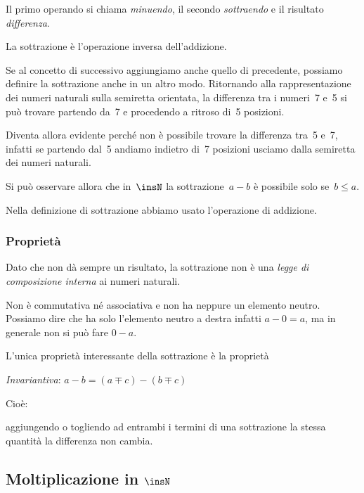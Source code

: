Il primo operando si chiama \emph{minuendo}, il secondo \emph{sottraendo} e 
il risultato \emph{differenza}.

La sottrazione è l'operazione inversa dell'addizione.

Se al concetto di successivo aggiungiamo anche quello di precedente, possiamo 
definire la sottrazione anche in un altro modo.
Ritornando alla rappresentazione dei numeri naturali sulla semiretta 
orientata, la differenza tra i numeri~7 e~5 si può trovare partendo da~7 e 
procedendo a ritroso di~5 posizioni.

Diventa allora evidente perché non è possibile trovare la differenza 
tra~5 e~7, infatti se partendo dal~5 andiamo indietro di~7 posizioni 
usciamo dalla semiretta dei numeri naturali.

\begin{inaccessibleblock}

\end{inaccessibleblock}

Si può osservare allora che in~$\insN$ la sottrazione~$a - b$ è possibile solo 
se~$b\leq a$.

\osservazione Nella definizione di sottrazione abbiamo usato l'operazione di 
addizione.

\subsubsection{Proprietà}

Dato che non dà sempre un risultato, la sottrazione non è una 
\emph{legge di composizione interna} ai numeri naturali. 

Non è commutativa né associativa e non ha neppure un elemento neutro.
Possiamo dire che ha solo l'elemento neutro a destra infatti $a - 0 = a$, 
ma in generale non si può fare $0 - a$.

L'unica proprietà interessante della sottrazione è la proprietà 
\begin{itemize*}
 \item \emph{Invariantiva}: $a - b = (a \mp c) - (b \mp c)$
\end{itemize*}

Cioè: 
\begin{definizione}
aggiungendo o togliendo ad entrambi i termini di una sottrazione 
la stessa quantità la differenza non  cambia.
\end{definizione}

\subsection{Moltiplicazione in $\insN$}

